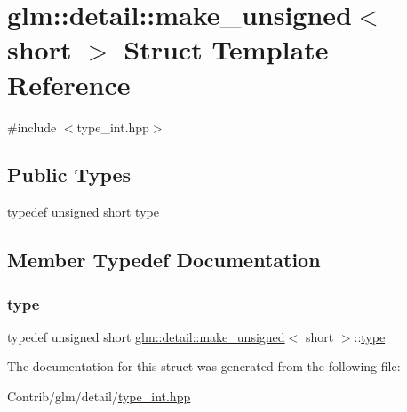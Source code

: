 \hypertarget{structglm_1_1detail_1_1make__unsigned_3_01short_01_4}{}\section{glm\+:\+:detail\+:\+:make\+\_\+unsigned$<$ short $>$ Struct Template Reference}
\label{structglm_1_1detail_1_1make__unsigned_3_01short_01_4}


{\ttfamily \#include $<$type\+\_\+int.\+hpp$>$}

\subsection*{Public Types}
\begin{DoxyCompactItemize}
\item 
typedef unsigned short \mbox{\hyperlink{structglm_1_1detail_1_1make__unsigned_3_01short_01_4_a58861091aca3a68acc085131cc6fefa4}{type}}
\end{DoxyCompactItemize}


\subsection{Member Typedef Documentation}
\mbox{\label{structglm_1_1detail_1_1make__unsigned_3_01short_01_4_a58861091aca3a68acc085131cc6fefa4}} 
\subsubsection{\texorpdfstring{type}{type}}
{\footnotesize\ttfamily typedef unsigned short \mbox{\hyperlink{structglm_1_1detail_1_1make__unsigned}{glm\+::detail\+::make\+\_\+unsigned}}$<$ short $>$\+::\mbox{\hyperlink{structglm_1_1detail_1_1make__unsigned_3_01short_01_4_a58861091aca3a68acc085131cc6fefa4}{type}}}



The documentation for this struct was generated from the following file\+:\begin{DoxyCompactItemize}
\item 
Contrib/glm/detail/\mbox{\hyperlink{type__int_8hpp}{type\+\_\+int.\+hpp}}\end{DoxyCompactItemize}
